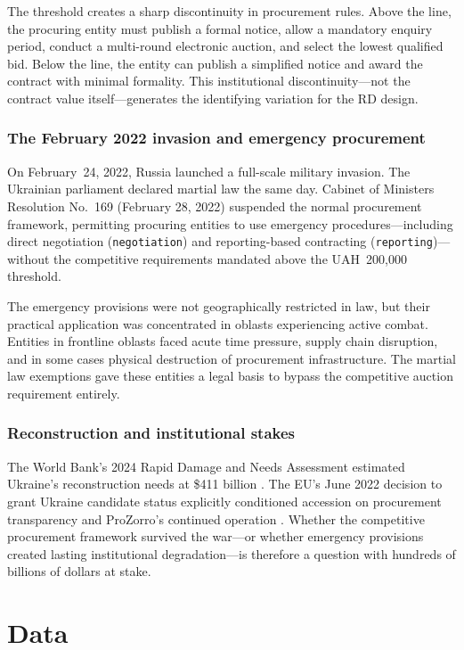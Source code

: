 \documentclass[12pt]{article}
\begin{document}
The threshold creates a sharp discontinuity in procurement rules. Above the line, the procuring entity must publish a formal notice, allow a mandatory enquiry period, conduct a multi-round electronic auction, and select the lowest qualified bid. Below the line, the entity can publish a simplified notice and award the contract with minimal formality. This institutional discontinuity---not the contract value itself---generates the identifying variation for the RD design.

\subsubsection*{The February 2022 invasion and emergency procurement} On February~24, 2022, Russia launched a full-scale military invasion. The Ukrainian parliament declared martial law the same day. Cabinet of Ministers Resolution No.~169 (February 28, 2022) suspended the normal procurement framework, permitting procuring entities to use emergency procedures---including direct negotiation (\texttt{negotiation}) and reporting-based contracting (\texttt{reporting})---without the competitive requirements mandated above the UAH~200,000 threshold.

The emergency provisions were not geographically restricted in law, but their practical application was concentrated in oblasts experiencing active combat. Entities in frontline oblasts faced acute time pressure, supply chain disruption, and in some cases physical destruction of procurement infrastructure. The martial law exemptions gave these entities a legal basis to bypass the competitive auction requirement entirely.

\subsubsection*{Reconstruction and institutional stakes} The World Bank's 2024 Rapid Damage and Needs Assessment estimated Ukraine's reconstruction needs at \$411 billion \citep{WorldBank2024}. The EU's June 2022 decision to grant Ukraine candidate status explicitly conditioned accession on procurement transparency and ProZorro's continued operation \citep{EU2022}. Whether the competitive procurement framework survived the war---or whether emergency provisions created lasting institutional degradation---is therefore a question with hundreds of billions of dollars at stake.


\section{Data}
\end{document}
